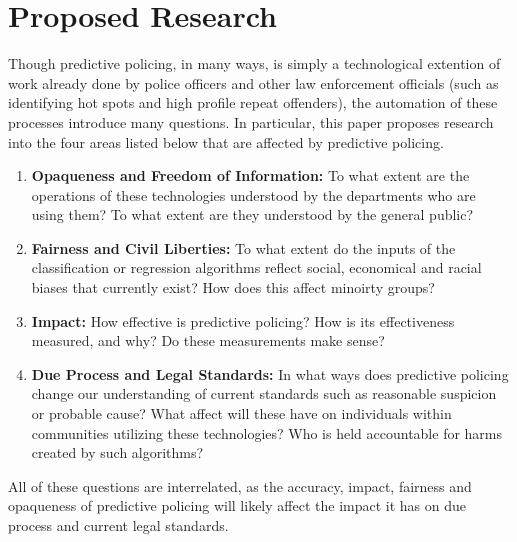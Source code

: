 \documentclass[12pt]{article} %
\begin{document}
\section{Proposed Research}\label{sec:proposedresearch} %

Though predictive policing, in many ways, is simply a technological extention of work already done by police officers and other law enforcement officials (such as identifying hot spots and high profile repeat offenders)\cite{perryetal}, the automation of these processes introduce many questions. In particular, this paper proposes research into the four areas listed below that are affected by predictive policing.

\begin{enumerate}
\item \textbf{Opaqueness and Freedom of Information:} To what extent are the operations of these technologies understood by the departments who are using them? To what extent are they understood by the general public?
\item \textbf{Fairness and Civil Liberties:} To what extent do the inputs of the classification or regression algorithms reflect social, economical and racial biases that currently exist? How does this affect minoirty groups? 
\item \textbf{Impact:} How effective is predictive policing? How is its effectiveness measured, and why? Do these measurements make sense?
\item \textbf{Due Process and Legal Standards:} In what ways does predictive policing change our understanding of current standards such as reasonable suspicion or probable cause? What affect will these have on individuals within communities utilizing these technologies? Who is held accountable for harms created by such algorithms?
\end{enumerate}

All of these questions are interrelated, as the accuracy, impact, fairness and opaqueness of predictive policing will likely affect the impact it has on due process and current legal standards. 
\end{document}

